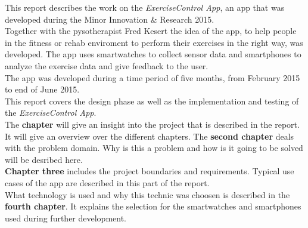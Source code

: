 This report describes the work on the \emph{ExerciseControl App}, an app that was developed during the Minor Innovation \& Research 2015.\\
Together with the pysotherapist Fred Kesert the idea of the app, to help people in the fitness or rehab enviroment to perform their exercises in the right way, was developed. The app uses smartwatches to collect sensor data and smartphones to analyze the exercise data and give feedback to the user. \\
The app was developed during a time period of five months, from February 2015 to end of June 2015. \\
This report covers the design phase as well as the implementation and testing of the \emph{ExerciseControl App}.\\
The \textbf{chapter} will give an insight into the project that is described in the report. It will give an overview over the different chapters.
The \textbf{second chapter} deals with the problem domain. Why is this a problem and how is it going to be solved will be desribed here.\\
\textbf{Chapter three} includes the project boundaries and requirements. Typical use cases of the app are described in this part of the report.  
\\
What technology is used and why this technic was choosen is described in the \textbf{fourth chapter}. It explains the selection for the smartwatches and smartphones used during further development.
\\